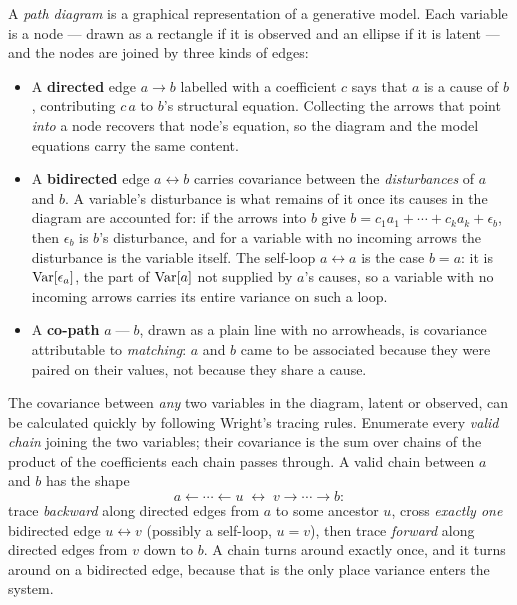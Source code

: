 \documentclass[12pt]{article}
\begin{document}
A \emph{path diagram} is a graphical representation of a generative model.
Each variable is a node --- drawn as a rectangle if it is observed and an ellipse if it is latent --- and the nodes are joined by three kinds of edges:

\begin{itemize}
    \item A \textbf{directed} edge $a \rightarrow b$ labelled with a coefficient $c$ says that $a$ is a cause of $b$, contributing $c\,a$ to $b$'s structural equation.
    Collecting the arrows that point \emph{into} a node recovers that node's equation, so the diagram and the model equations carry the same content.
    \item A \textbf{bidirected} edge $a \leftrightarrow b$ carries covariance between the \emph{disturbances} of $a$ and $b$.
    A variable's disturbance is what remains of it once its causes in the diagram are accounted for: if the arrows into $b$ give $b = c_1 a_1 + \cdots + c_k a_k + \epsilon_b$, then $\epsilon_b$ is $b$'s disturbance, and for a variable with no incoming arrows the disturbance is the variable itself.
    The self-loop $a \leftrightarrow a$ is the case $b=a$: it is $\mathrm{Var}[\epsilon_a]$, the part of $\mathrm{Var}[a]$ not supplied by $a$'s causes, so a variable with no incoming arrows carries its entire variance on such a loop.
    \item A \textbf{co-path} $a \;\text{---}\; b$, drawn as a plain line with no arrowheads, is covariance attributable to \emph{matching}: $a$ and $b$ came to be associated because they were paired on their values, not because they share a cause.
\end{itemize}

The covariance between \emph{any} two variables in the diagram, latent or observed, can be calculated quickly by following Wright's tracing rules.
Enumerate every \emph{valid chain} joining the two variables; their covariance is the sum over chains of the product of the coefficients each chain passes through.
A valid chain between $a$ and $b$ has the shape
$$
    a \leftarrow \cdots \leftarrow u \;\leftrightarrow\; v \rightarrow \cdots \rightarrow b :
$$
trace \emph{backward} along directed edges from $a$ to some ancestor $u$, cross \emph{exactly one} bidirected edge $u \leftrightarrow v$ (possibly a self-loop, $u=v$), then trace \emph{forward} along directed edges from $v$ down to $b$.
A chain turns around exactly once, and it turns around on a bidirected edge, because that is the only place variance enters the system.
\end{document}
